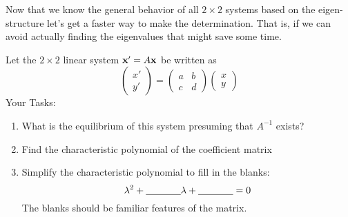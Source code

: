 Now that we know the general behavior of all $2 \times 2$ systems based on the
eigen-structure let's get a faster way to make the determination.  That is, if we can
avoid actually finding the eigenvalues that might save some time.
\begin{problem}
    Let the $2 \times 2$ linear system ${\bf x}' = A {\bf x}$ be written as
    \[ \begin{pmatrix} x' \\ y' \end{pmatrix} = \begin{pmatrix} a & b \\ c & d
        \end{pmatrix} \begin{pmatrix} x \\ y \end{pmatrix} \]
    Your Tasks:
    \begin{enumerate}
        \item What is the equilibrium of this system presuming that $A^{-1}$ exists?
        \item Find the characteristic polynomial of the coefficient matrix
        \item Simplify the characteristic polynomial to fill in the blanks:
            \[ \lambda^2 + \underline{\hspace{0.5in}} \lambda + \underline{\hspace{0.5in}}
                = 0
                \]
            The blanks should be familiar features of the matrix.
    \end{enumerate}
\end{problem}



